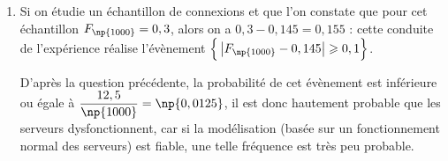\begin{enumerate}
\begin{enumerate}
On a donc bien l'inégalité annoncée.

		\item Si on étudie un échantillon de  connexions et que l'on constate que pour cet échantillon $F_{\np{1000}}=0,3$, alors on a $0,3 - 0,145 = 0,155$ : cette conduite de l'expérience réalise l'évènement $\Big\{ \left|F_{\np{1000}} - 0,145\strut \right| \geqslant 0,1\Big\}$.

D'après la question précédente, la probabilité de cet évènement est inférieure ou égale à $\dfrac{12,5}{\np{1000}} = \np{0,0125}$, il est donc hautement probable que les serveurs dysfonctionnent, car si la modélisation (basée sur un fonctionnement normal des serveurs) est fiable, une telle fréquence est très peu probable.
	\end{enumerate}
\end{enumerate}

\bigskip
